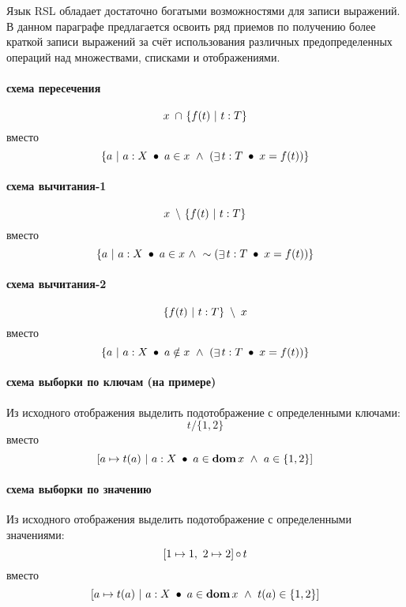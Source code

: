 \documentclass[14pt, twoside]{extreport}
\begin{document}
Язык RSL обладает достаточно богатыми возможностями для записи выражений. В данном параграфе предлагается освоить ряд приемов по получению более краткой записи выражений за счёт использования различных предопределенных операций над множествами, списками и отображениями.

\paragraph{схема пересечения}

$$x~\mathop{\cap}~ \{f(t) ~|~ t:T\}$$ вместо $$\{a ~|~ a: X ~\mathop{\bullet}~ a \in x ~\wedge~ ( \mathop{\exists} t: T  ~\mathop{\bullet}~ x = f(t) ) \}$$

\paragraph{схема вычитания-1}

$$x ~\mathop{\setminus}~ \{f(t) ~|~ t:T\}$$ вместо $$\{a ~|~ a: X ~\mathop{\bullet}~ a \in x ~\wedge~  \sim( \mathop{\exists} t: T  ~\mathop{\bullet}~ x = f(t) ) \}$$

\paragraph{схема вычитания-2}

$$\{f(t) ~|~ t:T\} ~\mathop{\setminus}~ x$$ вместо $$\{a ~|~ a: X ~\mathop{\bullet}~ a \notin x ~\wedge~ ( \mathop{\exists} t: T  ~\mathop{\bullet}~ x = f(t) ) \}$$

\paragraph{схема выборки по ключам (на примере)}
Из исходного отображения выделить подотображение с определенными ключами:
$$t / \{1, 2\}$$ вместо $$[a \mapsto t(a) ~|~ a:X ~\mathop{\bullet}~ a \in \mathop{\textbf{dom}} x ~\wedge~ a \in \{1, 2\} ]$$

\paragraph{схема выборки по значению}
Из исходного отображения выделить подотображение с определенными значениями:
$$[1 \mapsto 1,~ 2 \mapsto 2] \mathop{\circ} t$$ вместо $$[a \mapsto t(a) ~|~ a:X ~\mathop{\bullet}~ a \in \mathop{\textbf{dom}} x ~\wedge~ t(a) \in \{1,2\} ]$$

%
\end{document}

